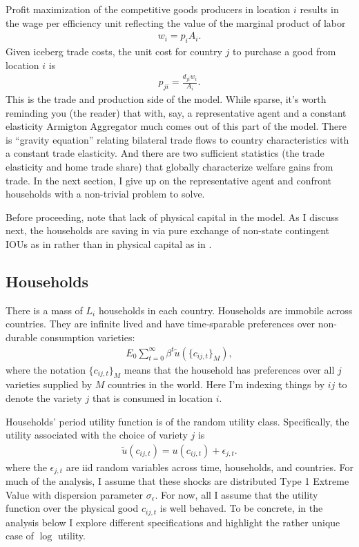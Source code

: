 \documentclass[12pt,pdftex]{article}
\begin{document}
\begin{onehalfspacing}
Profit maximization of the competitive goods producers in location $i$ results in the wage per efficiency unit reflecting the value of the marginal product of labor
\begin{align}
w_{i} = p_{i} A_{i}.
\label{eq:marginal-product}
\end{align}
Given iceberg trade costs, the unit cost for country $j$ to purchase a good from location $i$ is
\begin{align}
p_{ji} = \frac{d_{ji}w_{i}}{A_{i}}.
\label{eq:marginal-product-ship}
\end{align}
This is the trade and production side of the model. While sparse, it's worth reminding you (the reader) that with, say, a representative agent and a constant elasticity Armigton Aggregator much comes out of this part of the model. There is ``gravity equation'' relating bilateral trade flows to country characteristics with a constant trade elasticity. And there are two sufficient statistics (the trade elasticity and home trade share) that globally characterize welfare gains from trade. In the next section, I give up on the representative agent and confront households with a non-trivial problem to solve. 

Before proceeding, note that lack of physical capital in the model. As I discuss next, the households are saving in via pure exchange of non-state contingent IOUs as in \citet{huggett1993risk} rather than in physical capital as in \citet{aiyagari1994uninsured}.

\subsection{Households}

There is a mass of $L_i$ households in each country. Households are immobile across countries. They are infinite lived and have time-sparable preferences over non-durable consumption varieties:
\begin{align}
E_{0} \sum_{t = 0}^{\infty} \beta^{t} \tilde{u}( \{ c_{ij,t} \}_{M}),
\end{align}
where the notation $\{ c_{ij,t} \}_{M}$ means that the household has preferences over all $j$ varieties supplied by $M$ countries in the world. Here I'm indexing things by $ij$ to denote the variety $j$ that is consumed in location $i$.

Households' period utility function is of the random utility class. Specifically, the utility associated with the choice of variety $j$ is
\begin{align}
\tilde{u}( c_{ij,t} ) =  u(c_{ij,t}) + \epsilon_{j,t}. \label{eq:utility}
\end{align}
where the $\epsilon_{j,t}$ are iid random variables across time, households, and countries. For much of the analysis, I assume that these shocks are distributed Type 1 Extreme Value with dispersion parameter $\sigma_{\epsilon}$. For now, all I assume that the utility function over the physical good $c_{ij,t}$ is well behaved. To be concrete, in the analysis below I explore different specifications and highlight the rather unique case of $\log$ utility. 


\end{onehalfspacing}
\end{document}
